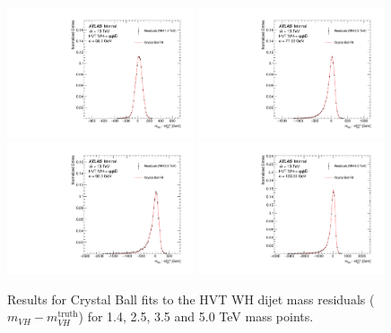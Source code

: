 \begin{figure}[htbp!]
\begin{center}
    \includegraphics[width=0.49\textwidth]{VHqqbb_WH_1400_ResoCrystalBall.pdf}
    \includegraphics[width=0.49\textwidth]{VHqqbb_WH_2500_ResoCrystalBall.pdf} \\
    \includegraphics[width=0.49\textwidth]{VHqqbb_WH_3500_ResoCrystalBall.pdf}
    \includegraphics[width=0.49\textwidth]{VHqqbb_WH_5000_ResoCrystalBall.pdf} \\
\end{center}
\caption{Results for Crystal Ball fits to the HVT WH dijet mass residuals ($m_{VH} - m_{VH}^{\mathrm{truth}}$) for 1.4, 2.5, 3.5 and 5.0 TeV mass points.}
\label{fig:mvh_reso_fits}
\end{figure}


